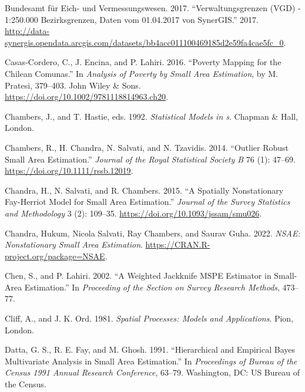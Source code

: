 \begin{CSLReferences}{1}{0}
\leavevmode{}%
Bundesamt für Eich- und Vermessungswesen. 2017. {``{Verwaltungsgrenzen (VGD) - 1:250.000 Bezirksgrenzen, Daten vom 01.04.2017 von SynerGIS}.''} 2017. \url{http://data-synergis.opendata.arcgis.com/datasets/bb4acc011100469185d2e59fa4cae5fc_0}.

\leavevmode{}%
Casas-Cordero, C., J. Encina, and P. Lahiri. 2016. {``Poverty Mapping for the Chilean Comunas.''} In \emph{Analysis of Poverty by Small Area Estimation}, by M. Pratesi, 379--403. John Wiley \& Sons. \url{https://doi.org/10.1002/9781118814963.ch20}.

\leavevmode{}%
Chambers, J., and T. Hastie, eds. 1992. \emph{Statistical Models in s}. Chapman \& Hall, London.

\leavevmode{}%
Chambers, R., H. Chandra, N. Salvati, and N. Tzavidis. 2014. {``Outlier Robust Small Area Estimation.''} \emph{Journal of the Royal Statistical Society B} 76 (1): 47--69. \url{https://doi.org/10.1111/rssb.12019}.

\leavevmode{}%
Chandra, H., N. Salvati, and R. Chambers. 2015. {``A Spatially Nonstationary {Fay-Herriot} Model for Small Area Estimation.''} \emph{Journal of the Survey Statistics and Methodology} 3 (2): 109--35. \url{https://doi.org/10.1093/jssam/smu026}.

\leavevmode{}%
Chandra, Hukum, Nicola Salvati, Ray Chambers, and Saurav Guha. 2022. \emph{{NSAE}: Nonstationary Small Area Estimation}. \url{https://CRAN.R-project.org/package=NSAE}.

\leavevmode{}%
Chen, S., and P. Lahiri. 2002. {``A Weighted Jackknife MSPE Estimator in Small-Area Estimation.''} In \emph{Proceeding of the Section on Survey Research Methods}, 473--77.

\leavevmode{}%
Cliff, A., and J. K. Ord. 1981. \emph{{Spatial Processes: Models and Applications}}. Pion, London.

\leavevmode{}%
Datta, G. S., R. E. Fay, and M. Ghosh. 1991. {``Hierarchical and Empirical Bayes Multivariate Analysis in Small Area Estimation.''} In \emph{Proceedings of Bureau of the Census 1991 Annual Research Conference}, 63--79. Washington, DC: US Bureau of the Census.


\end{CSLReferences}
